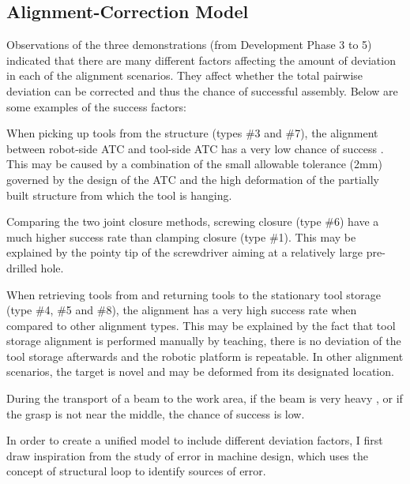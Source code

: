 \subsection{Alignment-Correction Model}
\label{subsection:new_hypo_alignment_correction_model}

Observations of the three demonstrations (from Development Phase 3 to 5) indicated that there are many different factors affecting the amount of deviation in each of the alignment scenarios. They affect whether the total pairwise deviation can be corrected and thus the chance of successful assembly. Below are some examples of the success factors:

\begin{description}[style=unboxed] %
	\item [Tight tolerance, deviation of partially assembled structure] When picking up tools from the structure (types \#3 and \#7), the alignment between robot-side ATC and tool-side ATC has a very low chance of success . This may be caused by a combination of the small allowable tolerance (2mm) governed by the design of the ATC and the high deformation of the partially built structure from which the tool is hanging. 

	\item [Correction range] Comparing the two joint closure methods, screwing closure (type \#6) have a much higher success rate than clamping closure (type \#1). This may be explained by the pointy tip of the screwdriver aiming at a relatively large pre-drilled hole.

	\item [Deviation] When retrieving tools from and returning tools to the stationary tool storage (type \#4, \#5 and \#8), the alignment has a very high success rate when compared to other alignment types. This may be explained by the fact that tool storage alignment is performed manually by teaching, there is no deviation of the tool storage afterwards and the robotic platform is repeatable. In other alignment scenarios, the target is novel and may be deformed from its designated location.

	\item [Payload] During the transport of a beam to the work area, if the beam is very heavy , or if the grasp is not near the middle, the chance of success is low. 

\end{description}
In order to create a unified model to include different deviation factors, I first draw inspiration from the study of error in machine design, which uses the concept of structural loop to identify sources of error.

